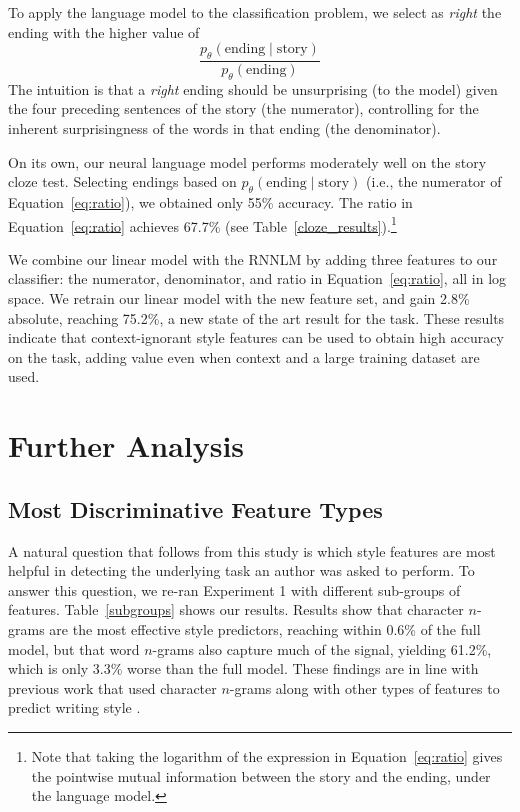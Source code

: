 \documentclass[11pt,a4paper]{article}
\newcommand{\tabref}[1]{Table~\ref{#1}}
\newcommand{\isection}[2]{\section{#1}\label{ssec:#2}}
\begin{document}
To apply the language model to the classification problem, we select
as \emph{right} the ending with the higher value of
\begin{equation}
\frac{p_\theta(\textrm{ending} \mid
  \textrm{story})}{p_\theta(\textrm{ending})} \label{eq:ratio}
\end{equation}
The intuition is that a \emph{right} ending should be unsurprising (to
the model)
given the four preceding sentences of the story (the numerator), controlling for the
inherent surprisingness of the words in that ending (the denominator).


On its own, our neural language model performs moderately well on the story cloze test. 
Selecting endings based on $p_\theta(\textrm{ending} \mid \textrm{story})$ (i.e., the numerator of
Equation~\ref{eq:ratio}), we obtained only 55\% accuracy.   The ratio
in Equation~\ref{eq:ratio} achieves 67.7\%  (see
\tabref{cloze_results}).\footnote{Note that taking the logarithm of
  the expression in Equation~\ref{eq:ratio} gives the pointwise mutual
information between the story and the ending, under the language
model.}

We combine our linear model with the RNNLM by adding three features to
our classifier: the numerator, denominator, and ratio in
Equation~\ref{eq:ratio}, all in log space. 
We retrain our linear  model with the new feature set, and gain 2.8\%
absolute, reaching 75.2\%, a new state of the art result for the task.
These results indicate that context-ignorant style features can be used to obtain high
accuracy on the task, adding value even when context and a large
training dataset are used. 




\isection{Further Analysis}{Ablation}


\subsection{Most Discriminative Feature Types}
A natural question that follows from this study is which style features are most
helpful in detecting the underlying task an author was asked
to perform. 
To answer this question, we re-ran Experiment 1 with different sub-groups of features. 
\tabref{subgroups} shows our results. Results show that  character $n$-grams are the most effective style predictors, reaching within  0.6\% of the full model, but that word $n$-grams also capture much of the signal, yielding 61.2\%, which is only 3.3\% worse than the full model. 
These findings are in line with previous work that used character $n$-grams along with other types of features to predict writing  style \cite{Schwartz:2013}.
\end{document}
